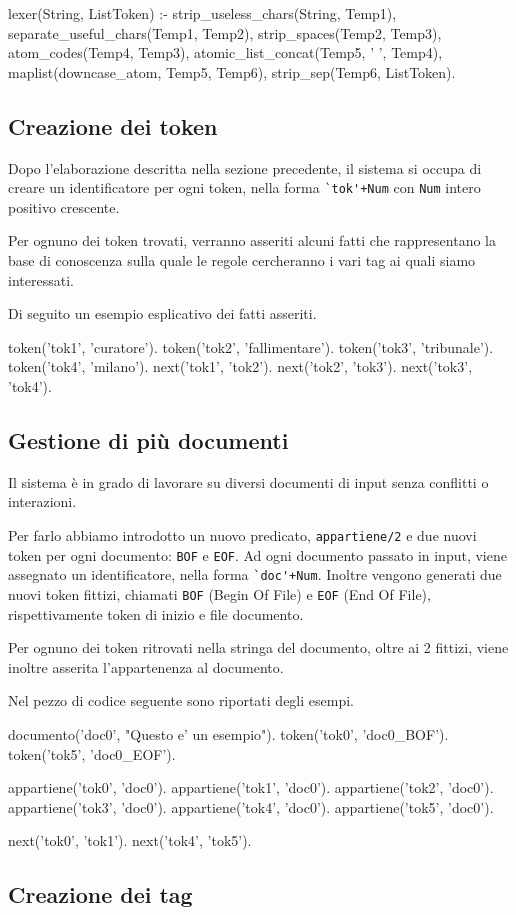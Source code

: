 \begin{prologcode}
lexer(String, ListToken) :-
   strip_useless_chars(String, Temp1),
   separate_useful_chars(Temp1, Temp2),
   strip_spaces(Temp2, Temp3),
   atom_codes(Temp4, Temp3),
   atomic_list_concat(Temp5, ' ', Temp4),
   maplist(downcase_atom, Temp5, Temp6),
   strip_sep(Temp6, ListToken).
\end{prologcode}

\subsection{Creazione dei token}
Dopo l'elaborazione descritta nella sezione precedente, il sistema si occupa di creare un identificatore per ogni token, nella forma \verb:`tok'+Num: con \verb+Num+ intero positivo crescente.

Per ognuno dei token trovati, verranno asseriti alcuni fatti che rappresentano la base di conoscenza sulla quale le regole cercheranno i vari tag ai quali siamo interessati.

Di seguito un esempio esplicativo dei fatti asseriti.

\begin{prologcode}
token('tok1', 'curatore').
token('tok2', 'fallimentare').
token('tok3', 'tribunale').
token('tok4', 'milano').
next('tok1', 'tok2').
next('tok2', 'tok3').
next('tok3', 'tok4').
\end{prologcode}


\subsection{Gestione di più documenti}
Il sistema è in grado di lavorare su diversi documenti di input senza conflitti o interazioni.

Per farlo abbiamo introdotto un nuovo predicato, \verb+appartiene/2+ e due nuovi token per ogni documento: \verb+BOF+ e \verb+EOF+.
Ad ogni documento passato in input, viene assegnato un identificatore, nella forma \verb:`doc'+Num:. Inoltre vengono generati due nuovi token fittizi, chiamati \verb+BOF+ (Begin Of File) e \verb+EOF+ (End Of File), rispettivamente token di inizio e file documento.

Per ognuno dei token ritrovati nella stringa del documento, oltre ai 2 fittizi, viene inoltre asserita l'appartenenza al documento.

Nel pezzo di codice seguente sono riportati degli esempi.

\begin{prologcode}
documento('doc0', "Questo e' un esempio").
token('tok0', 'doc0_BOF').
token('tok5', 'doc0_EOF').

appartiene('tok0', 'doc0').
appartiene('tok1', 'doc0').
appartiene('tok2', 'doc0').
appartiene('tok3', 'doc0').
appartiene('tok4', 'doc0').
appartiene('tok5', 'doc0').

next('tok0', 'tok1').
next('tok4', 'tok5').
\end{prologcode}

\subsection{Creazione dei tag}


